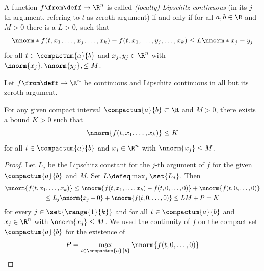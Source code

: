     \begin{definition}\label{def:lipschitz}
        A function $f\from\deff\to\R^n$ is called \emph{(locally) Lipschitz continuous} (in its $j$-th argument, refering to $t$ as zeroth argument) if and only if for all $a,b\in\R$ and $M>0$ there is a $L>0$, such that
        \begin{equation*}
            \nnorm*{f(t,x_1,\ldots,x_j,\ldots,x_k) - f(t,x_1,\ldots,y_j,\ldots,x_k)} \leq L\nnorm*{x_j-y_j}
        \end{equation*}
        for all $t\in\compactum{a}{b}$ and $x_j,y_j\in\R^n$ with $\nnorm{x_j},\nnorm{y_j},\leq M$.
    \end{definition}

    \begin{lemma}\label{lm:bounded-lipschitz}
        Let $f\from\deff\to\R^n$ be continuous and Lipschitz continuous in all but its zeroth argument.

        For any given compact interval $\compactum{a}{b}\subset\R$ and $M>0$, there exists a bound $K>0$ such that
        \begin{equation}
            \nnorm{f(t,x_1,\ldots,x_k)}\leq K
        \end{equation}
        for all $t\in\compactum{a}{b}$ and $x_j\in\R^n$ with $\nnorm{x_j}\leq M$.
    \end{lemma}
    \begin{proof}
        Let $L_j$ be the Lipschitz constant for the $j$-th argument of $f$ for the given $\compactum{a}{b}$ and $M$. Set $L\defeq\max_j\set{L_j}$. Then
        \begin{multline*}
            \nnorm{f(t,x_1,\ldots,x_k)} \leq \nnorm{f(t,x_1,\ldots,x_k) - f(t,0,\ldots,0)} + \nnorm{f(t,0,\ldots,0)}\\
            \leq L_j\nnorm{x_j-0} + \nnorm{f(t,0,\ldots,0)} \leq LM+P = K
        \end{multline*}
        for every $j\in\set{\range{1}{k}}$ and for all $t\in\compactum{a}{b}$ and $x_j\in\R^n$ with $\nnorm{x_j}\leq M$. We used the continuity of $f$ on the compact set $\compactum{a}{b}$ for the existence of
        \begin{equation*}
            P = \max_{t\in\compactum{a}{b}}\nnorm{f(t,0,\ldots,0)}
        \end{equation*}
    \end{proof}

